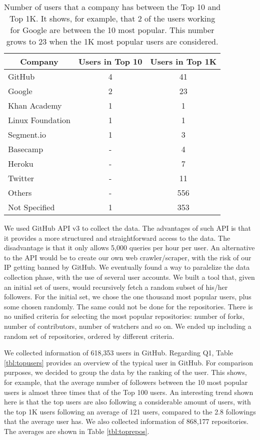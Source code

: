 \begin{table}
\centering
\begin{tabular}{ | l | c | c | }
	\hline
	\multicolumn{1}{|c|}{Company} & Users in Top 10 & Users in Top 1K \\ \hline
	GitHub & 4 & 41 \\ \hline
	Google & 2 & 23 \\ \hline
	Khan Academy & 1 & 1 \\ \hline
	Linux Foundation & 1 & 1 \\ \hline
	Segment.io & 1 & 3 \\ \hline
	Basecamp & - & 4 \\ \hline
	Heroku & - & 7 \\ \hline
	Twitter & - & 11 \\ \hline
	Others & - & 556 \\ \hline
	Not Specified & 1 & 353 \\ \hline
\end{tabular}
\caption{Number of users that a company has between the Top 10 and Top 1K. It shows, for example, that 2 of the users working for Google are between the 10 most popular. This number grows to 23 when the 1K most popular users are considered.}
\label{tbl:topcompanies}
\end{table}

We used GitHub API v3 \cite{GitHubAPI} to collect the data. The advantages of such API is that it provides a more structured and straightforward access to the data. The disadvantage is that it only allows 5,000 queries per hour per user. An alternative to the API would be to create our own web crawler/scraper, with the risk of our IP getting banned by GitHub. We eventually found a way to paralelize the data collection phase, with the use of several user accounts. We built a tool that, given an initial set of users, would recursively fetch a random subset of his/her followers. For the initial set, we chose the one thousand most popular users, plus some chosen randomly. The same could not be done for the repositories. There is no unified criteria for selecting the most popular repositories: number of forks, number of contributors, number of watchers and so on. We ended up including a random set of repositories, ordered by different criteria.

We collected information of 618,353 users in GitHub. Regarding Q1, Table \ref{tbl:topusers} provides an overview of the typical user in GitHub. For comparison purposes, we decided to group the data by the ranking of the user. This shows, for example, that the average number of followers between the 10 most popular users is almost three times that of the Top 100 users. An interesting trend shown here is that the top users are also following a considerable amount of users, with the top 1K users following an average of 121 users, compared to the 2.8 followings that the average user has. We also collected information of 868,177 repositories. The averages are shown in Table \ref{tbl:toprepos}.

